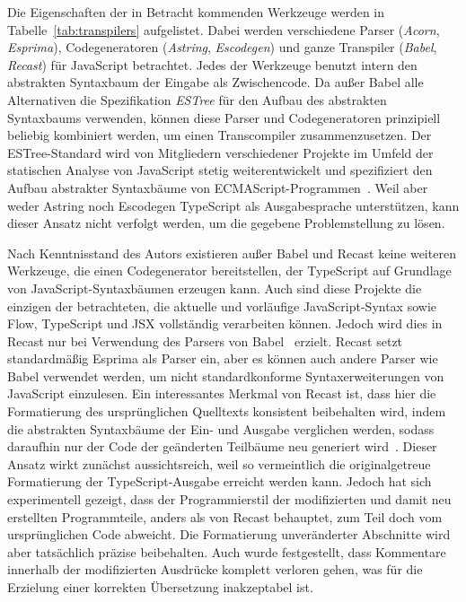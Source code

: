 

Die Eigenschaften der in Betracht kommenden Werkzeuge werden in Tabelle~\ref{tab:transpilers} aufgelistet. Dabei werden verschiedene Parser (\textit{Acorn}, \textit{Esprima}), Codegeneratoren (\textit{Astring}, \textit{Escodegen}) und ganze Transpiler (\textit{Babel}, \textit{Recast}) für JavaScript betrachtet. Jedes der Werkzeuge benutzt intern den abstrakten Syntaxbaum der Eingabe als Zwischencode. Da außer Babel alle Alternativen die Spezifikation \textit{ESTree} für den Aufbau des abstrakten Syntaxbaums verwenden, können diese Parser und Codegeneratoren prinzipiell beliebig kombiniert werden, um einen Transcompiler zusammenzusetzen. Der ESTree-Standard wird von Mitgliedern verschiedener Projekte im Umfeld der statischen Analyse von JavaScript stetig weiterentwickelt und spezifiziert den Aufbau abstrakter Syntaxbäume von ECMAScript-Programmen~\autocite{ESTREE_SPEC}. Weil aber weder Astring noch Escodegen TypeScript als Ausgabesprache unterstützen, kann dieser Ansatz nicht verfolgt werden, um die gegebene Problemstellung zu lösen.

Nach Kenntnisstand des Autors existieren außer Babel und Recast keine weiteren Werkzeuge, die einen Codegenerator bereitstellen, der TypeScript auf Grundlage von JavaScript-Syntaxbäumen erzeugen kann. Auch sind diese Projekte die einzigen der betrachteten, die aktuelle und vorläufige JavaScript-Syntax sowie Flow, TypeScript und JSX vollständig verarbeiten können. Jedoch wird dies in Recast nur bei Verwendung des Parsers von Babel~\autocite{BABEL:PARSER} erzielt. Recast setzt standardmäßig Esprima als Parser ein, aber es können auch andere Parser wie Babel verwendet werden, um nicht standardkonforme Syntaxerweiterungen von JavaScript einzulesen. Ein interessantes Merkmal von Recast ist, dass hier die Formatierung des ursprünglichen Quelltexts konsistent beibehalten wird, indem die abstrakten Syntaxbäume der Ein- und Ausgabe verglichen werden, sodass daraufhin nur der Code der geänderten Teilbäume neu generiert wird~\autocite{RECAST}. Dieser Ansatz wirkt zunächst aussichtsreich, weil so vermeintlich die originalgetreue Formatierung der TypeScript-Ausgabe erreicht werden kann. Jedoch hat sich experimentell gezeigt, dass der Programmierstil der modifizierten und damit neu erstellten Programmteile, anders als von Recast behauptet, zum Teil doch vom ursprünglichen Code abweicht. Die Formatierung unveränderter Abschnitte wird aber tatsächlich präzise beibehalten. Auch wurde festgestellt, dass Kommentare innerhalb der modifizierten Ausdrücke komplett verloren gehen, was für die Erzielung einer korrekten Übersetzung inakzeptabel ist.

